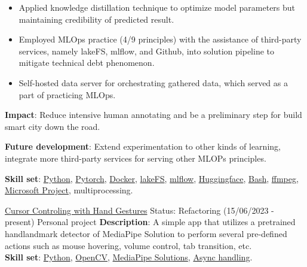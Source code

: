 \documentclass{src/preamble/doc_class}
\begin{document}
\begin{MainPart}
{\begin{itemize}[label=$\bullet$,topsep=-.5ex,itemsep=-0.5ex]
            	\item Applied knowledge distillation technique to optimize model parameters but maintaining credibility of predicted result.
            	
            	\item Employed MLOps practice (4/9 principles) with the assistance of third-party services, namely lakeFS, mlflow, and Github, into solution pipeline to mitigate technical debt phenomenon.
            	
            	\item Self-hosted data server for orchestrating gathered data, which served as a part of practicing MLOps.
            \end{itemize}
            \vspace{.15cm}
            
            \textbf{Impact}: Reduce intensive human annotating and be a preliminary step for build smart city down the road.
            \vspace{.15cm}
            
            \textbf{Future development}: Extend experimentation to other kinds of learning, integrate more third-party services for serving other MLOPs principles.
            \vspace{.1cm}

            \textbf{Skill set}: \href{https://www.python.org/}{Python}, \href{https://pytorch.org/}{Pytorch}, \href{https://www.docker.com/}{Docker}, \href{https://lakefs.io/}{lakeFS}, \href{https://mlflow.org/}{mlflow}, \href{https://huggingface.co/}{Huggingface}, \href{https://www.gnu.org/software/bash/}{Bash}, \href{https://ffmpeg.org/}{ffmpeg}, \href{https://www.microsoft.com/en/microsoft-365/planner/microsoft-planner?market=af}{Microsoft Project}, multiprocessing.
        }
		
		\Experience
		{\ColorHighlight}
		{\href{https://github.com/diligent-man/Cursor-controlling-with-hand-gestures/tree/main}{Cursor Controling with Hand Gestures}}
		{Status: Refactoring (15/06/2023 - present)}
		{Personal project}
		{
			\textbf{Description}: A simple app that utilizes a pretrained handlandmark detector of MediaPipe Solution to perform several pre-defined actions such as mouse hovering, volume control, tab transition, etc.\\
			
			\vspace{.15cm}
			\textbf{Skill set}: \href{https://www.python.org/}{Python}, \href{https://opencv.org/}{OpenCV}, \href{https://ai.google.dev/edge/mediapipe/solutions/guide}{MediaPipe Solutions}, \href{https://docs.python.org/3/library/asyncio.html}{Async handling}.
		}
		
		\end{MainPart}
		\newpage        
\end{document}
